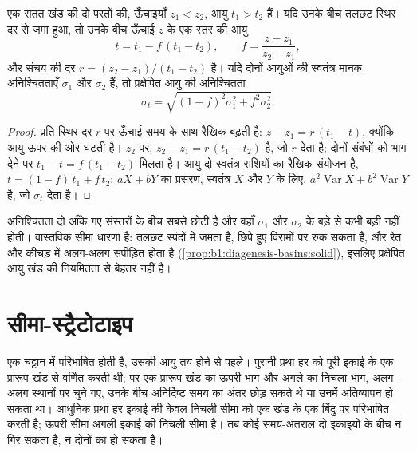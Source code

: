 \begin{proposition}[दो आँके गए स्तरों के बीच आयु]\label{prop:b1:stratigraphic-scale:interpolation}
एक सतत खंड की दो परतों की, ऊँचाइयाँ $z_1 < z_2$, आयु $t_1 > t_2$ हैं। यदि उनके बीच तलछट स्थिर दर से जमा हुआ, तो उनके बीच ऊँचाई $z$ के एक स्तर की आयु
\[
  t = t_1 - f\,(t_1 - t_2), \qquad f = \frac{z - z_1}{z_2 - z_1},
\]
और संचय की दर $r = (z_2 - z_1)/(t_1 - t_2)$ है। यदि दोनों आयुओं की स्वतंत्र मानक अनिश्चितताएँ $\sigma_1$ और $\sigma_2$ हैं, तो प्रक्षेपित आयु की अनिश्चितता
\[
  \sigma_t = \sqrt{(1 - f)^2 \sigma_1^2 + f^2 \sigma_2^2}.
\]
\end{proposition}

\begin{proof}
प्रति स्थिर दर $r$ पर ऊँचाई समय के साथ रैखिक बढ़ती है: $z - z_1 = r\,(t_1
- t)$, क्योंकि आयु ऊपर की ओर घटती है। $z_2$ पर, $z_2 - z_1 = r\,(t_1 - t_2)$ है, जो $r$ देता है; दोनों संबंधों को भाग देने पर $t_1 - t = f\,(t_1 - t_2)$ मिलता है। आयु दो स्वतंत्र राशियों का रैखिक संयोजन है, $t = (1 - f)\,t_1 + f\,t_2$; $a X + b Y$ का प्रसरण, स्वतंत्र $X$ और $Y$ के लिए, $a^2
\operatorname{Var} X + b^2 \operatorname{Var} Y$ है, जो $\sigma_t$ देता है।
\end{proof}

अनिश्चितता दो आँके गए संस्तरों के बीच सबसे छोटी है और वहाँ $\sigma_1$ और $\sigma_2$ के बड़े से कभी बड़ी नहीं होती। वास्तविक सीमा धारणा है: तलछट स्पंदों में जमता है, छिपे हुए विरामों पर रुक सकता है, और रेत और कीचड़ में अलग-अलग संपीड़ित होता है (\cref{prop:b1:diagenesis-basins:solid}), इसलिए प्रक्षेपित आयु खंड की नियमितता से बेहतर नहीं है।

\section{सीमा-स्ट्रैटोटाइप}\label{sec:b1:stratigraphic-scale:gssp}

एक  चट्टान में परिभाषित होती है, उसकी आयु तय होने से पहले। पुरानी प्रथा हर  को पूरी इकाई के एक प्रारूप खंड से वर्णित करती थी; पर एक प्रारूप खंड का ऊपरी भाग और अगले का निचला भाग, अलग-अलग स्थानों पर चुने गए, उनके बीच अनिर्दिष्ट समय का अंतर छोड़ सकते थे या उनमें अतिव्यापन हो सकता था। आधुनिक प्रथा हर इकाई की केवल निचली सीमा को एक खंड के एक बिंदु पर परिभाषित करती है; ऊपरी सीमा अगली इकाई की निचली सीमा है। तब कोई समय-अंतराल दो इकाइयों के बीच न गिर सकता है, न दोनों का हो सकता है।

